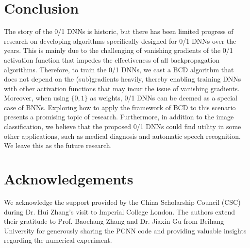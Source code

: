 \documentclass[journal]{IEEEtran}
\begin{document}
\section{Conclusion} \label{Section-conclusion}
The story of the 0/1 DNNs is historic, but there has been limited progress of research on developing algorithms specifically designed for 0/1 DNNs over the years. This is mainly due to the challenging of vanishing gradients of the 0/1 activation function that impedes the effectiveness of all backpropagation algorithms. Therefore, to train the 0/1 DNNs, we  cast a BCD algorithm that does not depend on the (sub)gradients heavily, thereby enabling training DNNs with other activation functions that may incur the issue of vanishing  gradients. {
Moreover, when using $\{0,1\}$ as weights, 0/1 DNNs can be deemed as a special case of BNNs. Exploring how to apply the framework of BCD to this scenario presents a promising topic of research.  Furthermore, in addition to the  image classification, we believe that the proposed 0/1 DNNs  could find utility in some other applications, such as medical diagnosis and automatic speech recognition. We leave this as the future research.}

\section*{Acknowledgements}
We acknowledge the support provided by the China Scholarship Council (CSC) during Dr. Hui Zhang's visit to Imperial College London. The authors extend their gratitude to Prof. Baochang Zhang and Dr. Jiaxin Gu from Beihang University for generously sharing the PCNN code and providing valuable insights regarding the numerical experiment.
\end{document}
